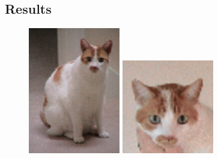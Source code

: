 \documentclass[12p,letterpaper]{article}
\begin{document}
		\subsection{Results}
			\begin{figure}[h]
				\centering
				\begin{minipage}{0.35\textwidth}
					\includegraphics[width=4cm]{images/prob2_large.PNG}
				\end{minipage}
				\begin{minipage}{0.35\textwidth}
					\includegraphics[width=4cm]{images/prob2_small.PNG}
				\end{minipage}
			\end{figure}
\end{document}
